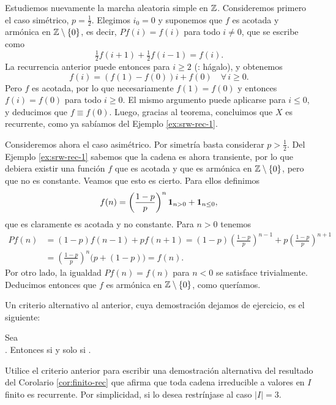 \begin{ex}\label{ex:srw-rec-2}
Estudiemos nuevamente la marcha aleatoria simple en $\mathbb{Z}$.
Consideremos primero el caso simétrico, $p=\frac12$.
Elegimos $i_0=0$ y suponemos que $f$ es acotada y armónica en $\mathbb{Z}\setminus\{0\}$, es decir, $Pf(i)=f(i)$ para todo $i\neq0$, que se escribe como
\[\tfrac12f(i+1)+\tfrac12f(i-1)=f(i).\]
La recurrencia anterior puede entonces para $i\geq2$ (\uexers: hágalo), y obtenemos
\[f(i)=(f(1)-f(0))i+f(0)\quad\forall\,i\geq0.\]
Pero $f$ es acotada, por lo que necesariamente $f(1)=f(0)$ y entonces $f(i)=f(0)$ para todo $i\geq0$.
El mismo argumento puede aplicarse para $i\leq0$, y deducimos que $f\equiv f(0)$.
Luego, gracias al teorema, concluimos que $X$ es recurrente, como ya sabíamos del Ejemplo \ref{ex:srw-rec-1}.

\noindent Consideremos ahora el caso asimétrico.
Por simetría basta considerar $p>\frac12$.
Del Ejemplo \ref{ex:srw-rec-1} sabemos que la cadena es ahora transiente, por lo que debiera existir una función $f$ que es acotada y que es armónica en $\mathbb{Z}\setminus\{0\}$, pero que no es constante.
Veamos que esto es cierto.
Para ellos definimos
\[f(n)=\left(\frac{1-p}{p}\right)^{n}\mathbf{1}_{n>0}+\mathbf{1}_{n\leq0},\]
que es claramente es acotada y no constante.
Para $n>0$ tenemos
\begin{align}
Pf(n)&=(1-p)f(n-1)+pf(n+1)=(1-p)\left(\frac{1-p}{p}\right)^{n-1}+p\left(\frac{1-p}{p}\right)^{n+1}\\
&=\left(\frac{1-p}{p}\right)^{n}\big(p+(1-p)\big)=f(n).
\end{align}
Por otro lado, la igualdad $Pf(n)=f(n)$ para $n<0$ se satisface trivialmente.
Deducimos entonces que $f$ es armónica en $\mathbb{Z}\setminus\{0\}$, como queríamos.
\end{ex}

Un criterio alternativo al anterior, cuya demostración dejamos de ejercicio, es el siguiente:

\begin{thm}
Sea\\ .
Entonces  si y solo si .
\end{thm}

\begin{exer}
Utilice el criterio anterior para escribir una demostración alternativa del resultado del Corolario \ref{cor:finito-rec} que afirma que toda cadena irreducible a valores en $I$ finito es recurrente.
Por simplicidad, si lo desea restrínjase al caso $|I|=3$.
\end{exer}

